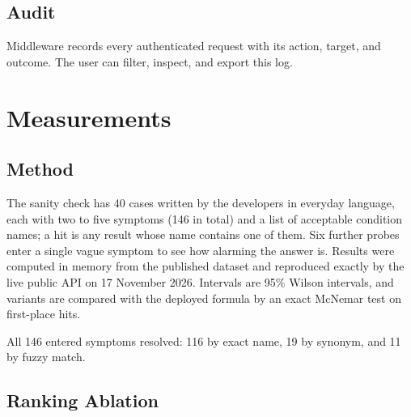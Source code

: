\documentclass[conference]{IEEEtran}
\begin{document}
\subsection{Audit}

Middleware records every authenticated request with its action, target, and outcome. The user can filter, inspect, and export this log.

\section{Measurements}

\subsection{Method}

The sanity check has 40 cases written by the developers in everyday language, each with two to five symptoms (146 in total) and a list of acceptable condition names; a hit is any result whose name contains one of them. Six further probes enter a single vague symptom to see how alarming the answer is. Results were computed in memory from the published dataset and reproduced exactly by the live public API on 17 November 2026. Intervals are 95\% Wilson intervals, and variants are compared with the deployed formula by an exact McNemar test on first-place hits.

All 146 entered symptoms resolved: 116 by exact name, 19 by synonym, and 11 by fuzzy match.

\subsection{Ranking Ablation}
\end{document}
